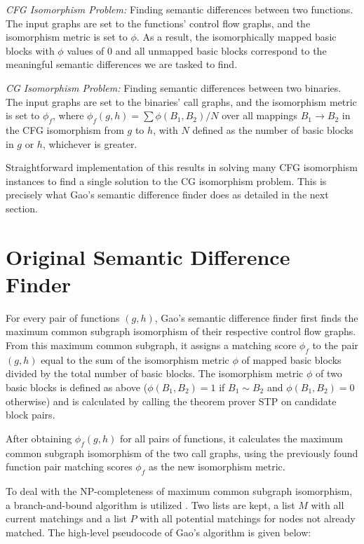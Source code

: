 \documentclass[11pt,twocolumn]{article}
\begin{document}
\emph{CFG Isomorphism Problem:} Finding semantic differences between two functions.  The input graphs are set to the functions' control flow graphs, and the isomorphism metric is set to $\phi$.  As a result, the isomorphically mapped basic blocks with $\phi$ values of 0 and all unmapped basic blocks correspond to the meaningful semantic differences we are tasked to find.

\emph{CG Isomorphism Problem:} Finding semantic differences between two binaries.  The input graphs are set to the binaries' call graphs, and the isomorphism metric is set to $\phi_f$, where $\phi_f (g,h) = \sum \phi(B_1,B_2) / N$ over all mappings $B_1 \rightarrow B_2$ in the CFG isomorphism from $g$ to $h$, with $N$ defined as the number of basic blocks in $g$ or $h$, whichever is greater. 

Straightforward implementation of this results in solving many CFG isomorphism instances to find a single solution to the CG isomorphism problem.
This is precisely what Gao's semantic difference finder does as detailed in the next section.

\section{Original Semantic Difference Finder}

For every pair of functions $(g,h)$, Gao's semantic difference finder first finds the maximum common subgraph isomorphism of their respective control flow graphs.  From this maximum common subgraph, it assigns a matching score $\phi_f$ to the pair $(g,h)$ equal to the sum of the isomorphism metric $\phi$ of mapped basic blocks divided by the total number of basic blocks.  The isomorphism metric $\phi$ of two basic blocks is defined as above ($\phi(B_1,B_2) = 1$ if $B_1 \sim B_2$ and $\phi(B_1,B_2) = 0$ otherwise) and is calculated by calling the theorem prover STP on candidate block pairs.

After obtaining $\phi_f(g,h)$ for all pairs of functions, it calculates the maximum common subgraph isomorphism of the two call graphs, using the previously found function pair matching scores $\phi_f$ as the new isomorphism metric.

To deal with the NP-completeness of maximum common subgraph isomorphism, a branch-and-bound algorithm is utilized \cite{backTrack}.  Two lists are kept, a list $M$ with all current matchings and a list $P$ with all potential matchings for nodes not already matched.  The high-level pseudocode of Gao's algorithm is given below:
\end{document}
